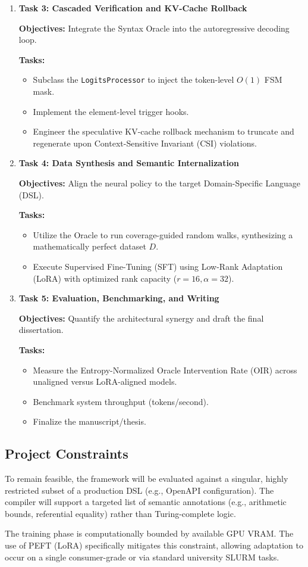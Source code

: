 \begin{enumerate}
\item \textbf{Task 3: Cascaded Verification and KV-Cache Rollback}

\textbf{Objectives:} Integrate the Syntax Oracle into the autoregressive decoding loop.

\textbf{Tasks:}
\begin{itemize}
\item Subclass the \texttt{LogitsProcessor} to inject the token-level $O(1)$ FSM mask.
\item Implement the element-level trigger hooks.
\item Engineer the speculative KV-cache rollback mechanism to 
truncate and regenerate upon Context-Sensitive Invariant (CSI) violations.
\end{itemize}

\item \textbf{Task 4: Data Synthesis and Semantic Internalization}

\textbf{Objectives:} Align the neural policy to the target Domain-Specific Language (DSL).

\textbf{Tasks:}
\begin{itemize}
\item Utilize the Oracle to run coverage-guided random walks, 
synthesizing a mathematically perfect dataset $D$.
\item Execute Supervised Fine-Tuning (SFT) using Low-Rank 
Adaptation (LoRA) with optimized rank capacity ($r=16, \alpha=32$).
\end{itemize}

\item \textbf{Task 5: Evaluation, Benchmarking, and Writing}

\textbf{Objectives:} Quantify the architectural synergy and draft the final dissertation.

\textbf{Tasks:}
\begin{itemize}
\item Measure the Entropy-Normalized Oracle Intervention Rate (OIR) 
across unaligned versus LoRA-aligned models.
\item Benchmark system throughput (tokens/second).
\item Finalize the manuscript/thesis.
\end{itemize}
\end{enumerate}

\subsection{Project Constraints}
To remain feasible, the framework will be evaluated against a singular, 
highly restricted subset of a production DSL (e.g., OpenAPI configuration). The 
compiler will support a targeted 
list of semantic annotations (e.g., arithmetic bounds, referential equality) 
rather than Turing-complete logic.

The training phase is computationally bounded by available GPU VRAM. 
The use of PEFT (LoRA) specifically mitigates this constraint, allowing 
adaptation to occur on a single consumer-grade or via standard university SLURM tasks.